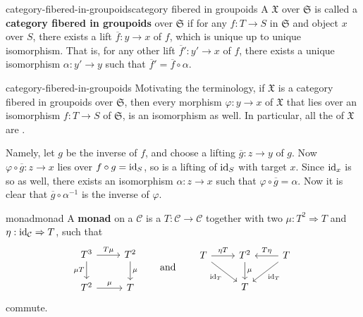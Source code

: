 \begin{topic}{category-fibered-in-groupoids}{category fibered in groupoids}
    A  $\mathfrak{X}$ over $\mathfrak{S}$ is called a \textbf{category fibered in groupoids} over $\mathfrak{S}$ if for any $f : T \to S$ in $\mathfrak{S}$ and object $x$ over $S$, there exists a lift $\overline{f} : y \to x$ of $f$, which is unique up to unique isomorphism. That is, for any other lift $\overline{f}' : y' \to x$ of $f$, there exists a unique isomorphism $\alpha : y' \to y$ such that $\overline{f}' = \overline{f} \circ \alpha$.
\end{topic}

\begin{example}{category-fibered-in-groupoids}
    Motivating the terminology, if $\mathfrak{X}$ is a category fibered in groupoids over $\mathfrak{S}$, then every morphism $\varphi : y \to x$ of $\mathfrak{X}$ that lies over an isomorphism $f : T \to S$ of $\mathfrak{S}$, is an isomorphism as well. In particular, all the  of $\mathfrak{X}$ are .

    Namely, let $g$ be the inverse of $f$, and choose a lifting $\overline{g} : z \to y$ of $g$. Now $\varphi \circ \overline{g} : z \to x$ lies over $f \circ g = \text{id}_S$, so is a lifting of $\text{id}_S$ with target $x$. Since $\text{id}_x$ is so as well, there exists an isomorphism $\alpha : z \to x$ such that $\varphi \circ \overline{g} = \alpha$. Now it is clear that $\overline{g} \circ \alpha^{-1}$ is the inverse of $\varphi$.
\end{example}

\begin{topic}{monad}{monad}
    A \textbf{monad} on a  $\mathcal{C}$ is a  $T : \mathcal{C} \to \mathcal{C}$ together with two  $\mu : T^2 \Rightarrow T$ and $\eta : \text{id}_{\mathcal{C}} \Rightarrow T$, such that
    \[ \begin{tikzcd} T^3 \arrow{r}{T \mu} \arrow[swap]{d}{\mu T} & T^2 \arrow{d}{\mu} \\ T^2 \arrow{r}{\mu} & T \end{tikzcd} \qquad \text{and} \qquad \begin{tikzcd} T \arrow{r}{\eta T} \arrow[swap]{dr}{\id_T} & T^2 \arrow{d}{\mu} & \arrow[swap]{l}{T \eta} T \arrow{ld}{\id_T} \\ & T & \end{tikzcd} \]
    commute.
\end{topic}

